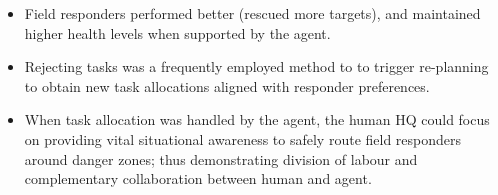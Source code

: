 \begin{itemize}
\item Field responders performed better (rescued more targets), and maintained higher health levels when supported by the agent.
\item Rejecting tasks was a frequently employed method to to trigger re-planning to obtain new task allocations aligned with responder preferences.
\item When task allocation was handled by the agent, the human HQ could focus on providing vital situational awareness to safely route field responders around danger zones; thus demonstrating division of labour and complementary collaboration between human and agent.
\end{itemize}

 
